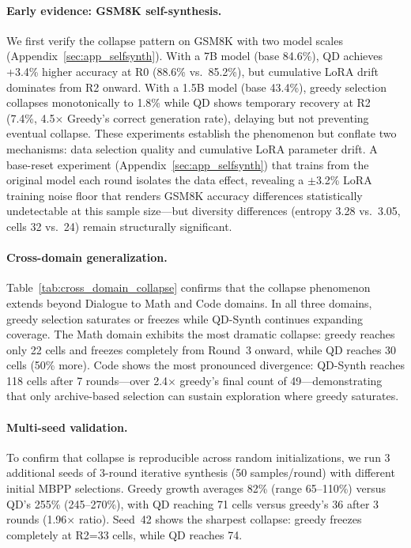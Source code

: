 \documentclass{article}
\begin{document}
\begin{enumerate}[nosep]
\paragraph{Early evidence: GSM8K self-synthesis.}
We first verify the collapse pattern on GSM8K with two model scales (Appendix~\ref{sec:app_selfsynth}).
With a 7B model (base 84.6\%), QD achieves +3.4\% higher accuracy at R0 (88.6\% vs.\ 85.2\%), but cumulative LoRA drift dominates from R2 onward.
With a 1.5B model (base 43.4\%), greedy selection collapses monotonically to 1.8\% while QD shows temporary recovery at R2 (7.4\%, 4.5$\times$ Greedy's correct generation rate), delaying but not preventing eventual collapse.
These experiments establish the phenomenon but conflate two mechanisms: data selection quality and cumulative LoRA parameter drift.
A base-reset experiment (Appendix~\ref{sec:app_selfsynth}) that trains from the original model each round isolates the data effect, revealing a $\pm$3.2\% LoRA training noise floor that renders GSM8K accuracy differences statistically undetectable at this sample size---but diversity differences (entropy 3.28 vs.\ 3.05, cells 32 vs.\ 24) remain structurally significant.

\paragraph{Cross-domain generalization.}
Table~\ref{tab:cross_domain_collapse} confirms that the collapse phenomenon extends beyond Dialogue to Math and Code domains. In all three domains, greedy selection saturates or freezes while QD-Synth continues expanding coverage. The Math domain exhibits the most dramatic collapse: greedy reaches only 22 cells and freezes completely from Round~3 onward, while QD reaches 30 cells (50\% more). Code shows the most pronounced divergence: QD-Synth reaches 118 cells after 7 rounds---over 2.4$\times$ greedy's final count of 49---demonstrating that only archive-based selection can sustain exploration where greedy saturates.

\paragraph{Multi-seed validation.}
To confirm that collapse is reproducible across random initializations, we run 3 additional seeds of 3-round iterative synthesis (50 samples/round) with different initial MBPP selections.
Greedy growth averages 82\% (range 65--110\%) versus QD's 255\% (245--270\%), with QD reaching 71 cells versus greedy's 36 after 3 rounds (1.96$\times$ ratio).
Seed~42 shows the sharpest collapse: greedy freezes completely at R2=33 cells, while QD reaches 74.


\end{enumerate}
\end{document}
